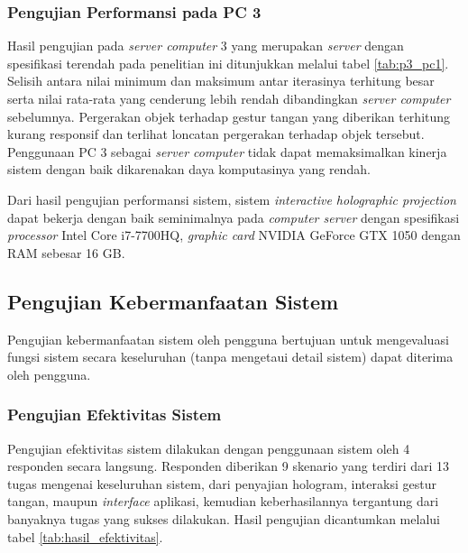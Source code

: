 \documentclass[conference]{IEEEtran}
\begin{document}
		\subsubsection{Pengujian Performansi pada PC 3}
			Hasil pengujian pada \textit{server computer} 3 yang merupakan \textit{server} dengan spesifikasi terendah pada penelitian ini ditunjukkan melalui tabel \ref{tab:p3_pc1}. Selisih antara nilai minimum dan maksimum antar iterasinya terhitung besar serta nilai rata-rata yang cenderung lebih rendah dibandingkan \textit{server computer} sebelumnya. Pergerakan objek terhadap gestur tangan yang diberikan terhitung kurang responsif dan terlihat loncatan pergerakan terhadap objek tersebut. Penggunaan PC 3 sebagai \textit{server computer} tidak dapat memaksimalkan kinerja sistem dengan baik dikarenakan daya komputasinya yang rendah.
			
		Dari hasil pengujian performansi sistem, sistem \textit{interactive holographic projection} dapat bekerja dengan baik seminimalnya pada \textit{computer server} dengan spesifikasi \textit{processor} Intel Core i7-7700HQ, \textit{graphic card} NVIDIA GeForce GTX 1050 dengan RAM sebesar 16 GB.
		
		
	\subsection{Pengujian Kebermanfaatan Sistem} 
		Pengujian kebermanfaatan sistem oleh pengguna bertujuan untuk mengevaluasi fungsi sistem secara keseluruhan (tanpa mengetaui detail sistem) dapat diterima oleh pengguna\cite{sawant2012software}.
	
		\subsubsection{Pengujian Efektivitas Sistem}
			\label{section:p4}
			Pengujian efektivitas sistem dilakukan dengan penggunaan sistem oleh 4 responden secara langsung. Responden diberikan 9 skenario yang terdiri dari 13 tugas mengenai keseluruhan sistem, dari penyajian hologram, interaksi gestur tangan, maupun \textit{interface} aplikasi, kemudian keberhasilannya tergantung dari banyaknya tugas yang sukses dilakukan. Hasil pengujian dicantumkan melalui tabel \ref{tab:hasil_efektivitas}.
			
\end{document}
